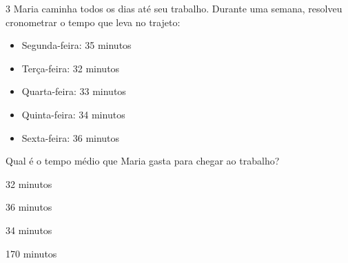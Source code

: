 







\num{3} Maria caminha todos os dias até seu trabalho. Durante uma semana,
resolveu cronometrar o tempo que leva no trajeto:

\begin{multicols}{2}
\begin{itemize}
\item Segunda-feira: 35 minutos

\item Terça-feira: 32 minutos

\item Quarta-feira: 33 minutos

\item Quinta-feira: 34 minutos

\item Sexta-feira: 36 minutos
\end{itemize}
\end{multicols}

Qual é o tempo médio que Maria gasta para chegar ao trabalho?

\begin{multicols}{2}
\begin{escolha}[itemsep=0pt]
\item 32 minutos
\item 36 minutos
\item 34 minutos
\item 170 minutos
\end{escolha}
\end{multicols}

